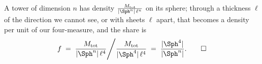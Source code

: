 A tower of dimension $n$ has density $\frac{M_{\mathrm{tot}}}{|\Sph^{n}|\,\ell^{n}}$ on its sphere; through a thickness $\ell$ of the direction we cannot see, or with sheets $\ell$ apart, that becomes a density per unit of our four-measure, and the share is
\[
f \;=\; \frac{M_{\mathrm{tot}}}{|\Sph^{n}|\,\ell^{4}} \Bigg/ \frac{M_{\mathrm{tot}}}{|\Sph^{4}|\,\ell^{4}} \;=\; \frac{|\Sph^{4}|}{|\Sph^{n}|} . \qedhere
\]
